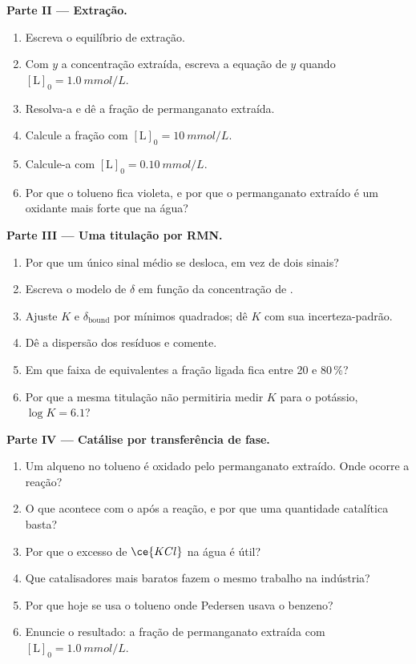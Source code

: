 \begin{problem}
\medskip\noindent\textbf{Parte II --- Extração.}
\begin{enumerate}[resume]
  \item Escreva o equilíbrio de extração.
  \item Com $y$ a concentração extraída, escreva a equação de $y$ quando
        $[\mathrm L]_0 = \qty{1.0}{mmol/L}$.
  \item Resolva-a e dê a fração de permanganato extraída.
  \item Calcule a fração com $[\mathrm L]_0 = \qty{10}{mmol/L}$.
  \item Calcule-a com $[\mathrm L]_0 = \qty{0.10}{mmol/L}$.
  \item Por que o tolueno fica violeta, e por que o permanganato extraído é um oxidante
        mais forte que na água?
\end{enumerate}

\medskip\noindent\textbf{Parte III --- Uma titulação por RMN.}
\begin{enumerate}[resume]
  \item Por que um único sinal médio se desloca, em vez de dois sinais?
  \item Escreva o modelo de $\delta$ em função da concentração de .
  \item Ajuste $K$ e $\delta_{\mathrm{bound}}$ por mínimos quadrados; dê $K$ com sua incerteza-padrão.
  \item Dê a dispersão dos resíduos e comente.
  \item Em que faixa de equivalentes a fração ligada fica entre 20 e 80\,\%?
  \item Por que a mesma titulação não permitiria medir $K$ para o potássio, $\log K = 6.1$?
\end{enumerate}

\medskip\noindent\textbf{Parte IV --- Catálise por transferência de fase.}
\begin{enumerate}[resume]
  \item Um alqueno no tolueno é oxidado pelo permanganato extraído. Onde ocorre
        a reação?
  \item O que acontece com o  após a reação, e por que uma quantidade catalítica
        basta?
  \item Por que o excesso de $\ce{KCl}$ na água é útil?
  \item Que catalisadores mais baratos fazem o mesmo trabalho na indústria?
  \item Por que hoje se usa o tolueno onde Pedersen usava o benzeno?
  \item Enuncie o resultado: a fração de permanganato extraída com
        $[\mathrm L]_0 = \qty{1.0}{mmol/L}$.
\end{enumerate}
\end{problem}
